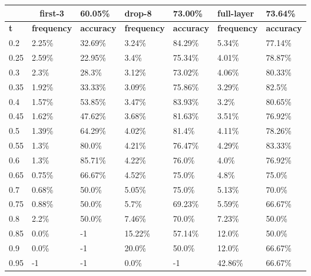 
\begin{table}[t]
\centering
\begin{tabular}{lllllll}
\hline
\multicolumn{1}{c}{} & \multicolumn{1}{c}{first-3} & \multicolumn{1}{l|}{60.05\%} & drop-8 & \multicolumn{1}{l|}{73.00\%} & full-layer & 73.64\% \\ \hline
\multicolumn{1}{l|}{\textbf{t}} & \textbf{frequency} & \multicolumn{1}{l|}{\textbf{accuracy}} & \textbf{frequency} & \multicolumn{1}{l|}{\textbf{accuracy}} & \textbf{frequency} & \textbf{accuracy} \\ \hline	\multicolumn{1}{l|}{0.2}&  2.25\% & \multicolumn{1}{l|}{32.69\%}& 3.24\% & \multicolumn{1}{l|}{84.29\%}& 5.34\% & 77.14\%\\ 
\multicolumn{1}{l|}{0.25}&  2.59\% & \multicolumn{1}{l|}{22.95\%}& 3.4\% & \multicolumn{1}{l|}{75.34\%}& 4.01\% & 78.87\%\\ 
\multicolumn{1}{l|}{0.3}&  2.3\% & \multicolumn{1}{l|}{28.3\%}& 3.12\% & \multicolumn{1}{l|}{73.02\%}& 4.06\% & 80.33\%\\ 
\multicolumn{1}{l|}{0.35}&  1.92\% & \multicolumn{1}{l|}{33.33\%}& 3.09\% & \multicolumn{1}{l|}{75.86\%}& 3.29\% & 82.5\%\\ 
\multicolumn{1}{l|}{0.4}&  1.57\% & \multicolumn{1}{l|}{53.85\%}& 3.47\% & \multicolumn{1}{l|}{83.93\%}& 3.2\% & 80.65\%\\ 
\multicolumn{1}{l|}{0.45}&  1.62\% & \multicolumn{1}{l|}{47.62\%}& 3.68\% & \multicolumn{1}{l|}{81.63\%}& 3.51\% & 76.92\%\\ 
\multicolumn{1}{l|}{0.5}&  1.39\% & \multicolumn{1}{l|}{64.29\%}& 4.02\% & \multicolumn{1}{l|}{81.4\%}& 4.11\% & 78.26\%\\ 
\multicolumn{1}{l|}{0.55}&  1.3\% & \multicolumn{1}{l|}{80.0\%}& 4.21\% & \multicolumn{1}{l|}{76.47\%}& 4.29\% & 83.33\%\\ 
\multicolumn{1}{l|}{0.6}&  1.3\% & \multicolumn{1}{l|}{85.71\%}& 4.22\% & \multicolumn{1}{l|}{76.0\%}& 4.0\% & 76.92\%\\ 
\multicolumn{1}{l|}{0.65}&  0.75\% & \multicolumn{1}{l|}{66.67\%}& 4.52\% & \multicolumn{1}{l|}{75.0\%}& 4.8\% & 75.0\%\\ 
\multicolumn{1}{l|}{0.7}&  0.68\% & \multicolumn{1}{l|}{50.0\%}& 5.05\% & \multicolumn{1}{l|}{75.0\%}& 5.13\% & 70.0\%\\ 
\multicolumn{1}{l|}{0.75}&  0.88\% & \multicolumn{1}{l|}{50.0\%}& 5.7\% & \multicolumn{1}{l|}{69.23\%}& 5.59\% & 66.67\%\\ 
\multicolumn{1}{l|}{0.8}&  2.2\% & \multicolumn{1}{l|}{50.0\%}& 7.46\% & \multicolumn{1}{l|}{70.0\%}& 7.23\% & 50.0\%\\ 
\multicolumn{1}{l|}{0.85}&  0.0\% & \multicolumn{1}{l|}{-1}& 15.22\% & \multicolumn{1}{l|}{57.14\%}& 12.0\% & 50.0\%\\ 
\multicolumn{1}{l|}{0.9}&  0.0\% & \multicolumn{1}{l|}{-1}& 20.0\% & \multicolumn{1}{l|}{50.0\%}& 12.0\% & 66.67\%\\ 
\multicolumn{1}{l|}{0.95}&  -1 & \multicolumn{1}{l|}{-1}& 0.0\% & \multicolumn{1}{l|}{-1}& 42.86\% & 66.67\%\\ 


\end{tabular}
\end{table}
